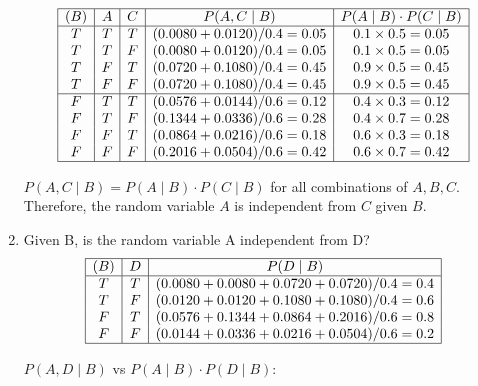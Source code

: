 \documentclass[12pt]{article}
\begin{document}
\begin{enumerate}[font=\Large,label=(\alph*)]
	      $$
		      \begin{array}{|c|c|c|c|c|}
			      \hline
			      (B) & A & C & P(A, C \mid B)           & P(A \mid B) \cdot P(C \mid B) \\
			      \hline
			      T   & T & T & (0.0080+0.0120)/0.4=0.05 & 0.1 \times 0.5 = 0.05         \\
			      T   & T & F & (0.0080+0.0120)/0.4=0.05 & 0.1 \times 0.5 = 0.05         \\
			      T   & F & T & (0.0720+0.1080)/0.4=0.45 & 0.9 \times 0.5 = 0.45         \\
			      T   & F & F & (0.0720+0.1080)/0.4=0.45 & 0.9 \times 0.5 = 0.45         \\
			      \hline
			      F   & T & T & (0.0576+0.0144)/0.6=0.12 & 0.4 \times 0.3 = 0.12         \\
			      F   & T & F & (0.1344+0.0336)/0.6=0.28 & 0.4 \times 0.7 = 0.28         \\
			      F   & F & T & (0.0864+0.0216)/0.6=0.18 & 0.6 \times 0.3 = 0.18         \\
			      F   & F & F & (0.2016+0.0504)/0.6=0.42 & 0.6 \times 0.7 = 0.42         \\
			      \hline
		      \end{array}
	      $$

	      $P(A, C \mid B) = P(A \mid B) \cdot P(C \mid B)$ for all combinations of $A,B,C$. Therefore, the random variable $A$ is independent from $C$ given $B$.

	\item Given B, is the random variable A independent from D?
	      $$
		      \begin{array}{|c|c|c|}
			      \hline
			      (B) & D & P(D \mid B)                                 \\
			      \hline
			      T   & T & (0.0080 + 0.0080 + 0.0720 + 0.0720)/0.4=0.4 \\
			      T   & F & (0.0120 + 0.0120 + 0.1080 + 0.1080)/0.4=0.6 \\
			      F   & T & (0.0576 + 0.1344 + 0.0864 + 0.2016)/0.6=0.8 \\
			      F   & F & (0.0144 + 0.0336 + 0.0216 + 0.0504)/0.6=0.2 \\
			      \hline
		      \end{array}
	      $$

	      $P(A, D \mid B)$ vs $P(A \mid B) \cdot P(D \mid B):$


\end{enumerate}
\end{document}

